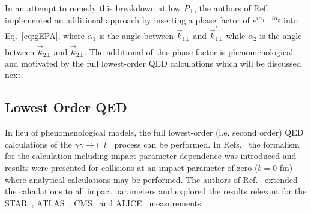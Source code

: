 \documentclass[12pt,epjc3]{svjour3}\sloppy
\begin{document}
In an attempt to remedy this breakdown at low $P_\perp$, the authors of Ref.~\cite{zhaInitialTransversemomentumBroadening2020b} implemented an additional approach by inserting a phase factor of $e^{i\alpha_1 + i\alpha_2}$ into Eq.~\ref{eq:gEPA}, where $\alpha_1$ is the angle between $\vec{k}_{1\bot}$ and $\vec{k}^{\prime}_{1\bot}$ while $\alpha_2$ is the angle between $\vec{k}_{2\bot}$ and $\vec{k}^{\prime}_{2\bot}$.
The additional of this phase factor is phenomenological and motivated by the full lowest-order QED calculations which will be discussed next.


\subsection{Lowest Order QED}
\label{sec:qed}
In lieu of phenomenological models, the full lowest-order (i.e. second order) QED calculations of the $\gamma\gamma \rightarrow l^+l^-$ process can be performed. 
In Refs.~\cite{PhysRevA.51.1874,PhysRevA.55.396} the formalism for the calculation including impact parameter dependence was introduced and results were presented for collisions at an impact parameter of zero ($b=0$ fm) where analytical calculations may be performed. The authors of Ref.~\cite{zhaInitialTransversemomentumBroadening2020b,brandenburgAcoplanarityQEDPairs2020b} extended the calculations to all impact parameters and explored the results relevant for the STAR~\cite{starcollaborationMeasurementMomentumAngular2021,starcollaborationLowEnsuremathPair2018b}, ATLAS~\cite{atlascollaborationObservationCentralityDependentAcoplanarity2018a}, CMS~\cite{cmscollaborationObservationForwardNeutron2020a} and ALICE~\cite{alicecollaborationMeasurementExcessYield2016b} measurements. 
\end{document}
